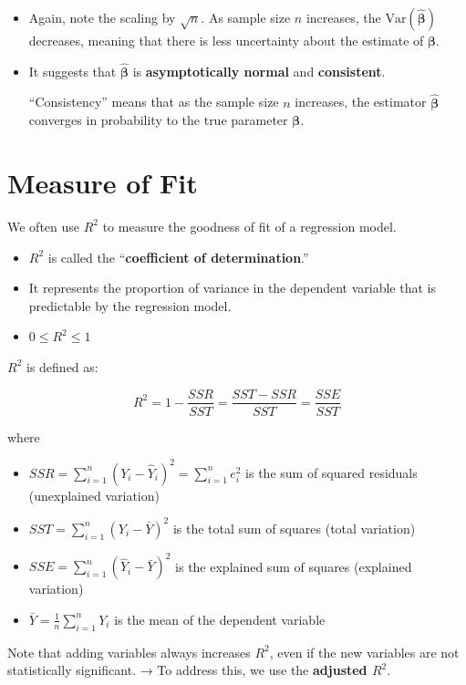 \documentclass[
  12pt,
  a4paper,
]{scrbook}
\providecommand{\tightlist}{%
  \setlength{\itemsep}{0pt}\setlength{\parskip}{0pt}}
\renewcommand{\tightlist}{\setlength{\itemsep}{0.5\baselineskip}\setlength{\parskip}{0.2\baselineskip}}
\newcommand{\bbeta}{\boldsymbol{\beta}}
\newcommand{\var}{\mathrm{Var}}
\theoremstyle{plain}
\theoremstyle{definition}
\theoremstyle{remark}
\begin{document}
\begin{itemize}
\item
  Again, note the scaling by \(\sqrt{n}.\) As sample size \(n\)
  increases, the \(\var(\hat{\bbeta})\) decreases, meaning that there is
  less uncertainty about the estimate of \(\bbeta\).
\item
  It suggests that \(\hat{\bbeta}\) is \textbf{asymptotically normal}
  and \textbf{consistent}.

  ``Consistency'' means that as the sample size \(n\) increases, the
  estimator \(\hat{\bbeta}\) converges in probability to the true
  parameter \(\bbeta\).
\end{itemize}

\section{Measure of Fit}\label{measure-of-fit}

We often use \(R^2\) to measure the goodness of fit of a regression
model.

\begin{itemize}
\tightlist
\item
  \(R^2\) is called the ``\textbf{coefficient of determination}.''
\item
  It represents the proportion of variance in the dependent variable
  that is predictable by the regression model.
\item
  \(0\le R^2\le 1\)
\end{itemize}

\(R^2\) is defined as:

\[
R^2 = 1 - \frac{SSR}{SST} = \frac{SST - SSR}{SST} = \frac{SSE}{SST}
\]

where

\begin{itemize}
\tightlist
\item
  \(SSR = \sum_{i=1}^{n} (Y_i - \hat{Y}_i)^2 = \sum_{i=1}^{n} e_i^2\) is
  the sum of squared residuals (unexplained variation)
\item
  \(SST = \sum_{i=1}^{n} (Y_i - \bar{Y})^2\) is the total sum of squares
  (total variation)
\item
  \(SSE = \sum_{i=1}^{n} (\hat{Y}_i - \bar{Y})^2\) is the explained sum
  of squares (explained variation)
\item
  \(\bar{Y}= \frac{1}{n}\sum_{i=1}^n Y_i\) is the mean of the dependent
  variable
\end{itemize}

Note that adding variables always increases \(R^2\), even if the new
variables are not statistically significant. → To address this, we use
the \textbf{adjusted \(R^2\)}.
\end{document}
